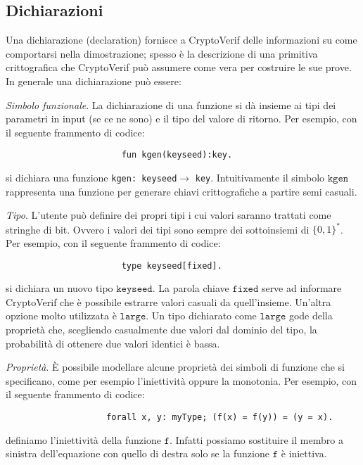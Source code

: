 \documentclass[a4paper,openright,twoside,12pt]{report}
\begin{document}
\subsection{Dichiarazioni}
Una dichiarazione (declaration) fornisce a CryptoVerif delle informazioni su come comportarsi nella dimostrazione; 
spesso \`e la descrizione di una primitiva crittografica che CryptoVerif pu\`o assumere come vera per costruire le sue prove.
In generale una dichiarazione pu\`o essere:
\begin{description}
 \item{\emph{Simbolo funzionale}.} La dichiarazione di una funzione si d\`a insieme ai tipi dei parametri in input (se ce ne sono) e il tipo del valore di ritorno. Per esempio, con il seguente frammento di codice:\\
				      \begin{verbatim}
				       fun kgen(keyseed):key.
				      \end{verbatim}	   
si dichiara una funzione \verb!kgen: keyseed!$\rightarrow$ \verb!key!. Intuitivamente il simbolo $\texttt{kgen}$ rappresenta una funzione per generare chiavi crittografiche a partire semi casuali.
 \item{\emph{Tipo}.} L'utente pu\`o definire dei propri tipi i cui valori saranno trattati come stringhe di bit.
	    Ovvero i valori dei tipi sono sempre dei sottoinsiemi di $\{0, 1\}^*$. Per esempio, con il seguente frammento di codice:
  				      \begin{verbatim}
				       type keyseed[fixed].
				      \end{verbatim}
si dichiara un nuovo tipo $\texttt{keyseed}$. La parola chiave $\texttt{fixed}$ serve ad informare CryptoVerif che \`e possibile estrarre valori casuali da quell'insieme.
Un'altra opzione molto utilizzata \`e $\texttt{large}$. Un tipo dichiarato come $\texttt{large}$ gode della propriet\`a che, scegliendo casualmente due valori dal dominio del tipo, la probabilit\`a di ottenere
due valori identici \`e bassa.
 \item{\emph{Propriet\`a}.} \`E possibile modellare alcune propriet\`a dei simboli di funzione che si specificano, come per esempio l'iniettivit\`a oppure la monotonia. Per esempio, con il seguente frammento di codice:
    				      \begin{verbatim}
				    forall x, y: myType; (f(x) = f(y)) = (y = x).
				      \end{verbatim}
definiamo l'iniettivit\`a della funzione $\texttt{f}$. Infatti possiamo sostituire il membro a sinistra dell'equazione con quello di destra solo se la funzione $\texttt{f}$ \`e iniettiva.

\end{description}
\end{document}
